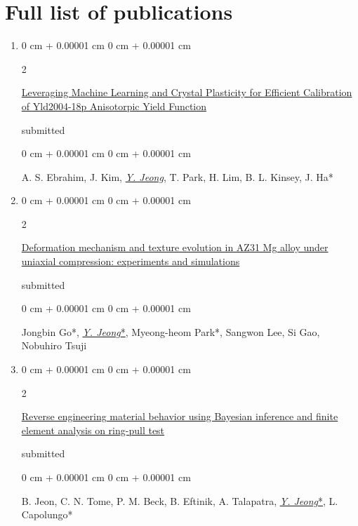 \documentclass[10pt, letterpaper]{article}
\newenvironment{onecolentry}{
    \begin{adjustwidth}{
        0 cm + 0.00001 cm
    }{
        0 cm + 0.00001 cm
    }
}{
    \end{adjustwidth}
} %
\newenvironment{twocolentry}[2][]{
    \onecolentry
    \def\secondColumn{#2}
    \setcolumnwidth{\fill, 4.5 cm}
    \begin{paracol}{2}
}{
    \switchcolumn \raggedleft \secondColumn
    \end{paracol}
    \endonecolentry
} %
\begin{document}
        \section{Full list of publications}
        \begin{enumerate}


        \item
          \begin{twocolentry}{submitted}
            \href{}{Leveraging Machine Learning and Crystal Plasticity for Efficient Calibration of Yld2004-18p Anisotorpic Yield Function}
          \end{twocolentry}
          \begin{onecolentry}
            A. S. Ebrahim,  J. Kim, {\underline{\textit{Y. Jeong}}}, T. Park, H. Lim, B. L. Kinsey, J. Ha*
          \end{onecolentry}
          \vspace{0.10 cm}


        \item
          \begin{twocolentry}{submitted}
            \href{}{Deformation mechanism and texture evolution in AZ31 Mg alloy under uniaxial compression: experiments and simulations}
          \end{twocolentry}
          \begin{onecolentry}
            Jongbin Go*,  {\underline{\textit{Y. Jeong}*}}, Myeong-heom Park*, Sangwon Lee, Si Gao, Nobuhiro Tsuji
          \end{onecolentry}
          \vspace{0.10 cm}

        \item
          \begin{twocolentry}{submitted}
            \href{}{Reverse engineering material behavior using Bayesian inference and finite element analysis on ring-pull test}
          \end{twocolentry}
          \begin{onecolentry}
            B. Jeon, C. N. Tome, P. M. Beck, B. Eftinik, A. Talapatra, {\underline{\textit{Y. Jeong}*}}, L. Capolungo*
          \end{onecolentry}
          \vspace{0.10 cm}




\end{enumerate}
\end{document}
